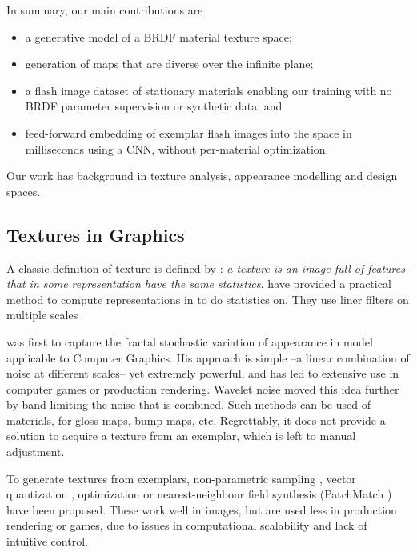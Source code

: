 \documentclass[acmtog, review, anonymous]{acmart}
\begin{document}
In summary, our main contributions are
\begin{itemize}
\item a generative model of a BRDF material texture space;
\item generation of maps that are diverse over the infinite plane;
\item a flash image dataset of stationary materials enabling our training with no BRDF parameter supervision or synthetic data; and
\item feed-forward embedding of exemplar flash images into the space in milliseconds using a CNN, without per-material optimization. 
\end{itemize}

Our work has background in texture analysis, appearance modelling and design spaces. 

\subsection{Textures in Graphics}
A classic definition of texture is defined by \citet{julesz1965texture}: \textit{a texture is an image full of features that in some representation have the same statistics.}
\citet{portilla2000parametric} have provided a practical method to compute representations in to do statistics on.
They use liner filters on multiple scales

\citet{perlin1985noise} was first to capture the fractal \cite{mandelbrot1983fractal} stochastic variation of appearance in model applicable to Computer Graphics.
His approach is simple --a linear combination of noise at different scales-- yet extremely powerful, and has led to extensive use in computer games or production rendering.
Wavelet noise \cite{cook2005wavelet} moved this idea further by band-limiting the noise that is combined.
Such methods can be used of materials, \eg for gloss maps, bump maps, etc.
Regrettably, it does not provide a solution to acquire a texture from an exemplar, which is left to manual adjustment.

To generate textures from exemplars, non-parametric sampling \cite{efros1999texture}, vector quantization \cite{wei2000fast}, optimization \cite{kwatra2005texture} or nearest-neighbour field synthesis (PatchMatch \cite{barnes2009patchmatch}) have been proposed.
These work well in images, but are used less in production rendering or games, due to issues in computational scalability and lack of intuitive control.
\end{document}
